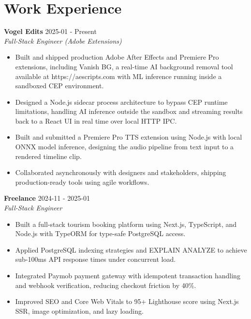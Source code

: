 \documentclass[11pt]{article}
\begin{document}
\section{Work Experience}
\textbf{Vogel Edits} \hfill 2025-01 - Present \\
\textit{Full-Stack Engineer (Adobe Extensions)}\\\begin{itemize}
\item Built and shipped production Adobe After Effects and Premiere Pro extensions, including Vanish BG, a real-time AI background removal tool available at https://aescripts.com with ML inference running inside a sandboxed CEP environment.
\item Designed a Node.js sidecar process architecture to bypass CEP runtime limitations, handling AI inference outside the sandbox and streaming results back to a React UI in real time over local HTTP IPC.
\item Built and submitted a Premiere Pro TTS extension using Node.js with local ONNX model inference, designing the audio pipeline from text input to a rendered timeline clip.
\item Collaborated asynchronously with designers and stakeholders, shipping production-ready tools using agile workflows.
\end{itemize}

\textbf{Freelance} \hfill 2024-11 - 2025-01 \\
\textit{Full-Stack Engineer}\\\begin{itemize}
\item Built a full-stack tourism booking platform using Next.js, TypeScript, and Node.js with TypeORM for type-safe PostgreSQL access.
\item Applied PostgreSQL indexing strategies and EXPLAIN ANALYZE to achieve sub-100ms API response times under concurrent load.
\item Integrated Paymob payment gateway with idempotent transaction handling and webhook verification, reducing checkout friction by 40\%.
\item Improved SEO and Core Web Vitals to 95+ Lighthouse score using Next.js SSR, image optimization, and lazy loading.
\end{itemize}
\end{document}
